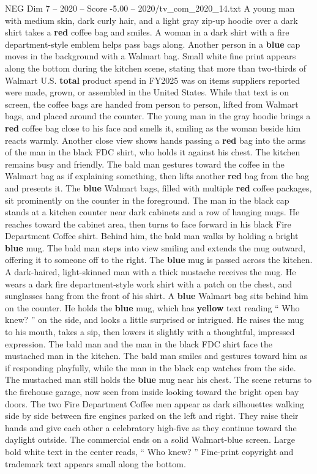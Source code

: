 \begin{textsample}{NEG Dim 7 – 2020 – Score -5.00 – 2020/tv\_com\_2020\_14.txt}
A young man with medium skin, dark curly hair, and a light gray zip-up hoodie over a dark shirt takes a \textbf{red} coffee bag and smiles.
A woman in a dark shirt with a fire department-style emblem helps pass bags along.
Another person in a \textbf{blue} cap moves in the background with a Walmart bag.
Small white fine print appears along the bottom during the kitchen scene, stating that more than two-thirds of Walmart U.S. \textbf{total} product spend in FY2025 was on items suppliers reported were made, grown, or assembled in the United States.
While that text is on screen, the coffee bags are handed from person to person, lifted from Walmart bags, and placed around the counter.
The young man in the gray hoodie brings a \textbf{red} coffee bag close to his face and smells it, smiling as the woman beside him reacts warmly.
Another close view shows hands passing a \textbf{red} bag into the arms of the man in the black FDC shirt, who holds it against his chest.
The kitchen remains busy and friendly.
The bald man gestures toward the coffee in the Walmart bag as if explaining something, then lifts another \textbf{red} bag from the bag and presents it.
The \textbf{blue} Walmart bags, filled with multiple \textbf{red} coffee packages, sit prominently on the counter in the foreground.
The man in the black cap stands at a kitchen counter near dark cabinets and a row of hanging mugs.
He reaches toward the cabinet area, then turns to face forward in his black Fire Department Coffee shirt.
Behind him, the bald man walks by holding a bright \textbf{blue} mug.
The bald man steps into view smiling and extends the mug outward, offering it to someone off to the right.
The \textbf{blue} mug is passed across the kitchen.
A dark-haired, light-skinned man with a thick mustache receives the mug.
He wears a dark fire department-style work shirt with a patch on the chest, and sunglasses hang from the front of his shirt.
A \textbf{blue} Walmart bag sits behind him on the counter.
He holds the \textbf{blue} mug, which has \textbf{yellow} text reading “ Who knew? ” on the side, and looks a little surprised or intrigued.
He raises the mug to his mouth, takes a sip, then lowers it slightly with a thoughtful, impressed expression.
The bald man and the man in the black FDC shirt face the mustached man in the kitchen.
The bald man smiles and gestures toward him as if responding playfully, while the man in the black cap watches from the side.
The mustached man still holds the \textbf{blue} mug near his chest.
The scene returns to the firehouse garage, now seen from inside looking toward the bright open bay doors.
The two Fire Department Coffee men appear as dark silhouettes walking side by side between fire engines parked on the left and right.
They raise their hands and give each other a celebratory high-five as they continue toward the daylight outside.
The commercial ends on a solid Walmart-blue screen.
Large bold white text in the center reads, “ Who knew? ” Fine-print copyright and trademark text appears small along the bottom.

\end{textsample}
